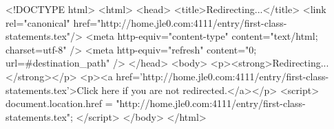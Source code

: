 <!DOCTYPE html>
<html>
<head>
<title>Redirecting...</title>
<link rel="canonical" href="http://home.jle0.com:4111/entry/first-class-statements.tex"/>
<meta http-equiv="content-type" content="text/html; charset=utf-8" />
<meta http-equiv="refresh" content="0; url=#{destination_path}" />
</head>
<body>
  <p><strong>Redirecting...</strong></p>
  <p><a href='http://home.jle0.com:4111/entry/first-class-statements.tex'>Click here if you are not redirected.</a></p>
  <script>
    document.location.href = "http://home.jle0.com:4111/entry/first-class-statements.tex";
  </script>
</body>
</html>
